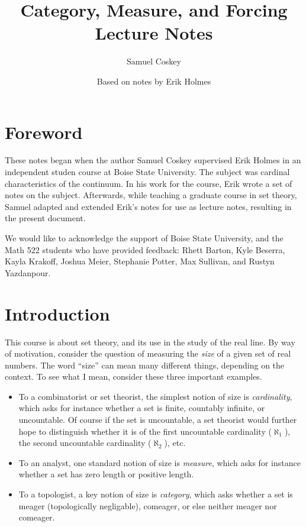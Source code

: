 \documentclass[11pt,oneside,a4paper]{amsbook}
\title[Category, Measure, and Forcing]{Category, Measure, and Forcing\\\smaller Lecture Notes}
\author{Samuel Coskey}
\author{Based on notes by Erik Holmes}
\theoremstyle{definition}
\theoremstyle{plain}
\theoremstyle{definition}
\theoremstyle{remark}
\numberwithin{equation}{section}
\numberwithin{figure}{section}
\begin{document}
\frontmatter

\maketitle

\tableofcontents

\chapter*{Foreword}

These notes began when the author Samuel Coskey supervised Erik Holmes in an independent studen course at Boise State University. The subject was cardinal characteristics of the continuum. In his work for the course, Erik wrote a set of notes on the subject. Afterwards, while teaching a graduate course in set theory, Samuel adapted and extended Erik's notes for use as lecture notes, resulting in the present document.

We would like to acknowledge the support of Boise State University, and the Math 522 students who have provided feedback: Rhett Barton, Kyle Beserra, Kayla Krakoff, Joshua Meier, Stephanie Potter, Max Sullivan, and Rustyn Yazdanpour.


\mainmatter
\setcounter{page}{4}
\chapter*{Introduction}

This course is about set theory, and its use in the study of the real line. By way of motivation, consider the question of measuring the \emph{size} of a given set of real numbers. The word ``size'' can mean many different things, depending on the context. To see what I mean, consider these three important examples.

\begin{itemize}
  \item To a combinatorist or set theorist, the simplest notion of size is
\emph{cardinality}, which asks for instance whether a set is finite, countably infinite, or uncountable. Of course if the set is uncountable, a set theorist would further hope to distinguish whether it is of the first uncountable cardinality ($\aleph_1$), the second uncountable cardinality ($\aleph_2$), etc.
  \item To an analyst, one standard notion of size is \emph{measure}, which asks for instance whether a set has zero length or positive length.
  \item To a topologist, a key notion of size is \emph{category}, which asks whether a set is meager (topologically negligable), comeager, or else neither meager nor comeager.
\end{itemize}
\end{document}
